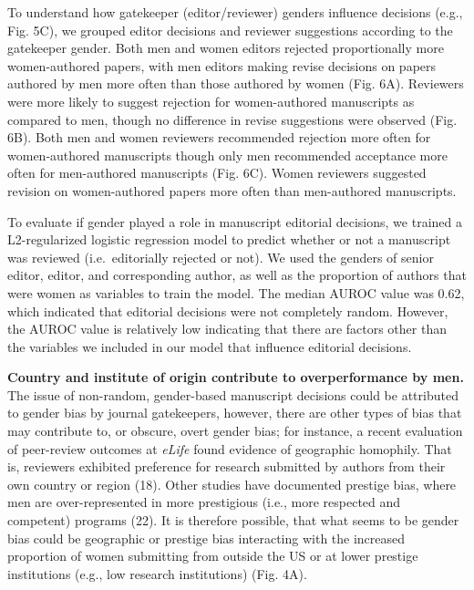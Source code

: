 \documentclass[11pt,]{article}
\begin{document}
To understand how gatekeeper (editor/reviewer) genders influence
decisions (e.g., Fig. 5C), we grouped editor decisions and reviewer
suggestions according to the gatekeeper gender. Both men and women
editors rejected proportionally more women-authored papers, with men
editors making revise decisions on papers authored by men more often
than those authored by women (Fig. 6A). Reviewers were more likely to
suggest rejection for women-authored manuscripts as compared to men,
though no difference in revise suggestions were observed (Fig. 6B). Both
men and women reviewers recommended rejection more often for
women-authored manuscripts though only men recommended acceptance more
often for men-authored manuscripts (Fig. 6C). Women reviewers suggested
revision on women-authored papers more often than men-authored
manuscripts.

To evaluate if gender played a role in manuscript editorial decisions,
we trained a L2-regularized logistic regression model to predict whether
or not a manuscript was reviewed (i.e.~editorially rejected or not). We
used the genders of senior editor, editor, and corresponding author, as
well as the proportion of authors that were women as variables to train
the model. The median AUROC value was 0.62, which indicated that
editorial decisions were not completely random. However, the AUROC value
is relatively low indicating that there are factors other than the
variables we included in our model that influence editorial decisions.

\textbf{Country and institute of origin contribute to overperformance by
men.} The issue of non-random, gender-based manuscript decisions could
be attributed to gender bias by journal gatekeepers, however, there are
other types of bias that may contribute to, or obscure, overt gender
bias; for instance, a recent evaluation of peer-review outcomes at
\emph{eLife} found evidence of geographic homophily. That is, reviewers
exhibited preference for research submitted by authors from their own
country or region (18). Other studies have documented prestige bias,
where men are over-represented in more prestigious (i.e., more respected
and competent) programs (22). It is therefore possible, that what seems
to be gender bias could be geographic or prestige bias interacting with
the increased proportion of women submitting from outside the US or at
lower prestige institutions (e.g., low research institutions) (Fig. 4A).
\end{document}

